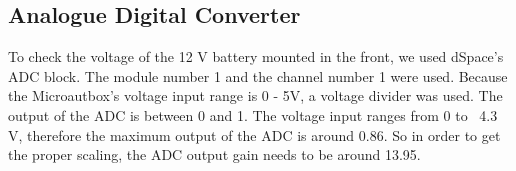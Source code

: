 \subsection{Analogue Digital Converter}

To check the voltage of the 12 V battery mounted in the front, we used dSpace's ADC block. The module number 1 and the channel number 1 were used. Because the Microautbox's voltage input range is 0 - 5V, a voltage divider was used. The output of the ADC is between 0 and 1. The voltage input ranges from 0 to ~4.3 V, therefore the maximum output of the ADC is around 0.86. So in order to get the proper scaling, the ADC output gain needs to be around 13.95. 